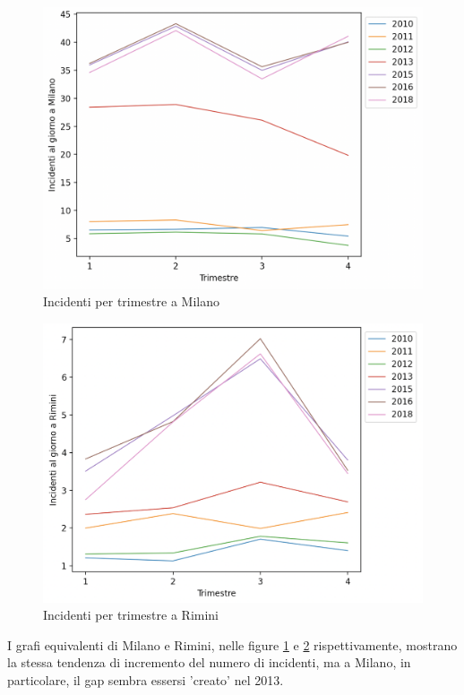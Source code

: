 \documentclass[a4paper]{report}
\begin{document}
\begin{figure}
    \includegraphics[width=\linewidth]{../src/incidenti/incidenti_senza_coords/mese_incidenti/milano_trimestre.png}
    \caption{Incidenti per trimestre a Milano}
    \label{fig:milano-trimestre}
\end{figure}

\begin{figure}
    \includegraphics[width=\linewidth]{../src/incidenti/incidenti_senza_coords/mese_incidenti/rimini_trimestre.png}
    \caption{Incidenti per trimestre a Rimini}
    \label{fig:rimini-trimestre}
\end{figure}

I grafi equivalenti di Milano e Rimini, nelle figure 
\ref{fig:milano-trimestre} e \ref{fig:rimini-trimestre} rispettivamente, 
mostrano la stessa tendenza di incremento del numero 
di incidenti, ma a Milano, in particolare, il gap sembra essersi 'creato' nel 2013.
\end{document}
